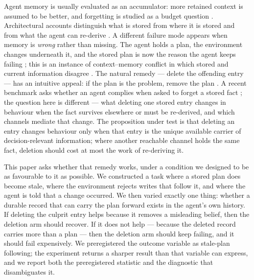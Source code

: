 \documentclass[11pt]{article}
\begin{document}
\begin{sloppypar}
Agent memory is usually evaluated as an accumulator: more retained context is assumed to be better, and forgetting is studied as a budget question \cite{wang2023augmenting,xu2025amem,hu2025evaluatingmemory,packer2023memgpt,zhong2023memorybank,park2023generative}. Architectural accounts distinguish what is stored from where it is stored and from what the agent can re-derive \cite{sumers2023cognitive,zhou2026externalization}. A different failure mode appears when memory is \emph{wrong} rather than missing. The agent holds a plan, the environment changes underneath it, and the stored plan is now the reason the agent keeps failing \cite{chao2026stale}; this is an instance of context--memory conflict in which stored and current information disagree \cite{xu2024knowledge}. The natural remedy --- delete the offending entry --- has an intuitive appeal: if the plan is the problem, remove the plan \cite{wei2026fademem}. A recent benchmark asks whether an agent complies when asked to forget a stored fact \cite{xie2026unlearning}; the question here is different --- what deleting one stored entry changes in behaviour when the fact survives elsewhere or must be re-derived, and which channels mediate that change. The proposition under test is that deleting an entry changes behaviour only when that entry is the unique available carrier of decision-relevant information; where another reachable channel holds the same fact, deletion should cost at most the work of re-deriving it.

This paper asks whether that remedy works, under a condition we designed to be as favourable to it as possible. We constructed a task where a stored plan does become stale, where the environment rejects writes that follow it, and where the agent is told that a change occurred. We then varied exactly one thing: whether a durable record that can carry the plan forward exists in the agent's own history. If deleting the culprit entry helps because it removes a misleading belief, then the deletion arm should recover. If it does not help --- because the deleted record carries more than a plan --- then the deletion arm should keep failing, and it should fail expensively. We preregistered the outcome variable as stale-plan following; the experiment returns a sharper result than that variable can express, and we report both the preregistered statistic and the diagnostic that disambiguates it.


\end{sloppypar}
\end{document}
